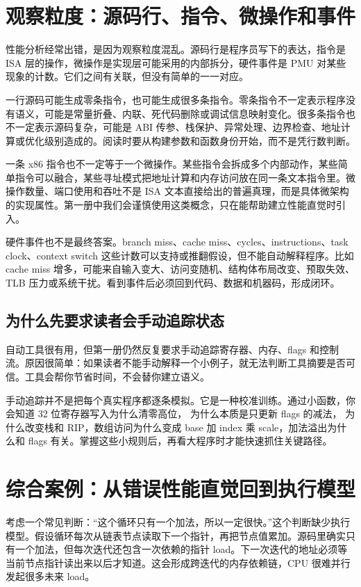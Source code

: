 \section{观察粒度：源码行、指令、微操作和事件}

性能分析经常出错，是因为观察粒度混乱。源码行是程序员写下的表达，指令是 ISA 层的操作，微操作是实现层可能采用的内部拆分，硬件事件是 PMU 对某些现象的计数。它们之间有关联，但没有简单的一一对应。

一行源码可能生成零条指令，也可能生成很多条指令。零条指令不一定表示程序没有语义，可能是常量折叠、内联、死代码删除或调试信息映射变化。很多条指令也不一定表示源码复杂，可能是 ABI 传参、栈保护、异常处理、边界检查、地址计算或优化级别造成的。阅读时要从构建参数和函数身份开始，而不是凭行数判断。

一条 x86 指令也不一定等于一个微操作。某些指令会拆成多个内部动作，某些简单指令可以融合，某些寻址模式把地址计算和内存访问放在同一条文本指令里。微操作数量、端口使用和吞吐不是 ISA 文本直接给出的普遍真理，而是具体微架构的实现属性。第一册中我们会谨慎使用这类概念，只在能帮助建立性能直觉时引入。

硬件事件也不是最终答案。branch miss、cache miss、cycles、instructions、task clock、context switch 这些计数可以支持或推翻假设，但不能自动解释程序。比如 cache miss 增多，可能来自输入变大、访问变随机、结构体布局改变、预取失效、TLB 压力或系统干扰。看到事件后必须回到代码、数据和机器码，形成闭环。

\subsection{为什么先要求读者会手动追踪状态}

自动工具很有用，但第一册仍然反复要求手动追踪寄存器、内存、flags 和控制流。原因很简单：如果读者不能手动解释一个小例子，就无法判断工具摘要是否可信。工具会帮你节省时间，不会替你建立语义。

手动追踪并不是把每个真实程序都逐条模拟。它是一种校准训练。通过小函数，你会知道 32 位寄存器写入为什么清零高位， 为什么本质是只更新 flags 的减法， 为什么改变栈和 RIP，数组访问为什么变成 base 加 index 乘 scale，加法溢出为什么和 flags 有关。掌握这些小规则后，再看大程序时才能快速抓住关键路径。

\section{综合案例：从错误性能直觉回到执行模型}

考虑一个常见判断：“这个循环只有一个加法，所以一定很快。”这个判断缺少执行模型。假设循环每次从链表节点读取下一个指针，再把节点值累加。源码里确实只有一个加法，但每次迭代还包含一次依赖的指针 load。下一次迭代的地址必须等当前节点指针读出来以后才知道。这会形成跨迭代的内存依赖链，CPU 很难并行发起很多未来 load。

